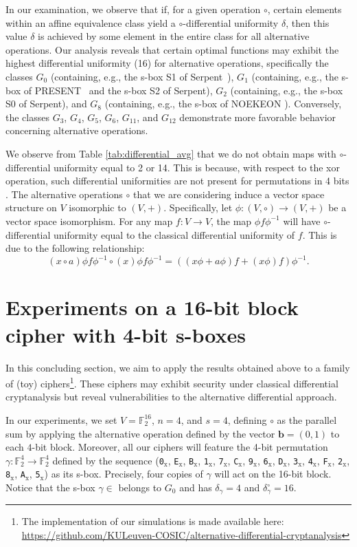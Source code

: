 \documentclass[runningheads,a4paper,english]{llncs}
\newcommand{\F}{\mathbb{F}}
\newcommand{\hex}[1]{\texttt{#1}$_\text{x}$}
\begin{document}
In our examination, we observe that if, for a given operation $\circ$, certain elements within an affine equivalence class yield a $\circ$-differential uniformity $\delta$, then this value $\delta$ is achieved by some element in the entire class for all alternative operations.
Our analysis reveals that certain optimal functions may exhibit the highest differential uniformity (16) for alternative operations, specifically the classes $G_0$ (containing, e.g., the s-box S1 of Serpent~\cite{biham1998serpent}), $G_1$ (containing, e.g., the s-box of PRESENT~\cite{bogdanov2007present} and the s-box S2 of Serpent), $G_2$ (containing, e.g., the s-box S0 of Serpent), and $G_8$ (containing, e.g., the s-box of NOEKEON \cite{noekeon}). Conversely, the classes $G_3$, $G_4$, $G_5$, $G_6$, $G_{11}$, and $G_{12}$ demonstrate more favorable behavior concerning alternative operations. 


\begin{remark}
    We observe from Table \ref{tab:differential_avg} that we do not obtain maps with {\(\circ\)-differential} uniformity equal to 2 or 14. This is because, with respect to the xor operation, such differential uniformities are not present for permutations in 4 bits \cite{leander2007classification}. The alternative operations \(\circ\) that we are considering induce a vector space structure on \(V\) isomorphic to \((V, +)\). Specifically, let \(\phi: (V, \circ) \to (V, +)\) be a vector space isomorphism. For any map \(f: V \to V\), the map \(\phi  f  \phi^{-1}\) will have \(\circ\)-differential uniformity equal to the classical differential uniformity of \(f\). This is due to the following relationship:
\[
(x \circ a) \phi  f  \phi^{-1} \circ (x) \phi  f  \phi^{-1} = ((x \phi + a \phi) f + (x \phi) f) \phi^{-1}.
\]\end{remark}
\section{Experiments on a 16-bit block cipher with 4-bit s-boxes}
\label{sec:experiments}
\setcounter{footnote}{1}
In this concluding section, we aim to apply the results obtained above to a family of (toy) ciphers\footnote{The implementation of our simulations is made available here: \url{https://github.com/KULeuven-COSIC/alternative-differential-cryptanalysis}}. These ciphers may exhibit security under classical differential cryptanalysis but reveal vulnerabilities to the alternative differential approach.

In our experiments, we set $V = \F_2^{16}$, $n=4$, and $s=4$, defining $\circ$ as the parallel sum by applying the alternative operation defined by the vector $\mathbf{b} = (0, 1)$ to each $4$-bit block.
Moreover, all our ciphers will feature the 4-bit permutation $\gamma :\F_2^4 \rightarrow \F_2^4$ defined by the  sequence 
 (\hex{0}, \hex{E}, \hex{B}, \hex{1}, \hex{7}, \hex{C}, \hex{9}, \hex{6}, \hex{D}, \hex{3}, \hex{4}, \hex{F}, \hex{2}, \hex{8}, \hex{A}, \hex{5}) as its s-box.
Precisely, four copies of $\gamma$ will act on the 16-bit block. Notice that the s-box $\gamma \in $ belongs to $G_0$ and has 
$\delta_\gamma=4$ and $\delta^\circ_\gamma=16$.
\end{document}
